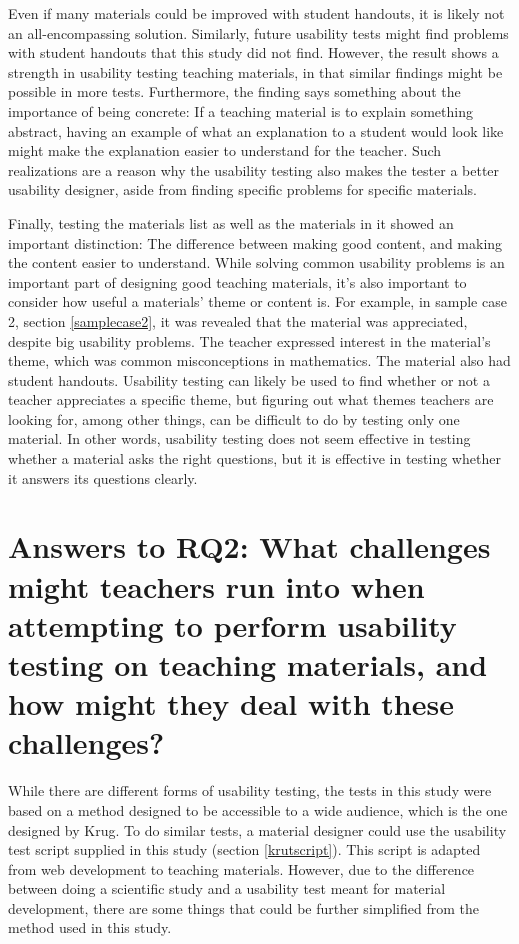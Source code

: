 Even if many materials could be improved with student handouts, it is likely not an all-encompassing solution. Similarly, future usability tests might find problems with student handouts that this study did not find. However, the result shows a strength in usability testing teaching materials, in that similar findings might be possible in more tests. Furthermore, the finding says something about the importance of being concrete: If a teaching material is to explain something abstract, having an example of what an explanation to a student would look like might make the explanation easier to understand for the teacher. Such realizations are a reason why the usability testing also makes the tester a better usability designer, aside from finding specific problems for specific materials.

Finally, testing the materials list as well as the materials in it showed an important distinction: The difference between making good content, and making the content easier to understand. While solving common usability problems is an important part of designing good teaching materials, it's also important to consider how useful a materials' theme or content is. For example, in sample case 2, section \ref{samplecase2}, it was revealed that the material was appreciated, despite big usability problems. The teacher expressed interest in the material's theme, which was common misconceptions in mathematics. The material also had student handouts. Usability testing can likely be used to find whether or not a teacher appreciates a specific theme, but figuring out what themes teachers are looking for, among other things, can be difficult to do by testing only one material. In other words, usability testing does not seem effective in testing whether a material asks the right questions, but it is effective in testing whether it answers its questions clearly.

\section{Answers to RQ2: What challenges might teachers run into when attempting to perform usability testing on teaching materials, and how might they deal with these challenges?}

While there are different forms of usability testing, the tests in this study were based on a method designed to be accessible to a wide audience, which is the one designed by Krug. To do similar tests, a material designer could use the usability test script supplied in this study (section \ref{krutscript}). This script is adapted from web development to teaching materials. However, due to the difference between doing a scientific study and a usability test meant for material development, there are some things that could be further simplified from the method used in this study.

